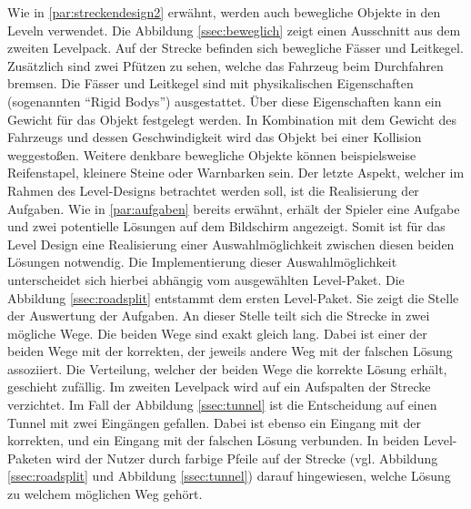 		Wie in \ref{par:streckendesign2} erwähnt, werden auch bewegliche Objekte in den Leveln verwendet. Die Abbildung \ref{ssec:beweglich} zeigt einen Ausschnitt aus dem zweiten Levelpack. Auf der Strecke befinden sich bewegliche Fässer und Leitkegel. Zusätzlich sind zwei Pfützen zu sehen, welche das Fahrzeug beim Durchfahren bremsen. Die Fässer und Leitkegel sind mit physikalischen Eigenschaften (sogenannten \enquote{Rigid Bodys}) ausgestattet. Über diese Eigenschaften kann ein Gewicht für das Objekt festgelegt werden. In Kombination mit dem Gewicht des Fahrzeugs und dessen Geschwindigkeit wird das Objekt bei einer Kollision weggestoßen. Weitere denkbare bewegliche Objekte können beispielsweise Reifenstapel, kleinere Steine oder Warnbarken sein.
		Der letzte Aspekt, welcher im Rahmen des Level-Designs betrachtet werden soll, ist die Realisierung der Aufgaben. Wie in \ref{par:aufgaben} bereits erwähnt, erhält der Spieler eine Aufgabe und zwei potentielle Lösungen auf dem Bildschirm angezeigt. Somit ist für das Level Design eine Realisierung einer Auswahlmöglichkeit zwischen diesen beiden Lösungen notwendig. Die Implementierung dieser Auswahlmöglichkeit unterscheidet sich hierbei abhängig vom ausgewählten Level-Paket.
		Die Abbildung \ref{ssec:roadsplit} entstammt dem ersten Level-Paket. Sie zeigt die Stelle der Auswertung der Aufgaben. An dieser Stelle teilt sich die Strecke in zwei mögliche Wege. Die beiden Wege sind exakt gleich lang. Dabei ist einer der beiden Wege mit der korrekten, der jeweils andere Weg mit der falschen Lösung assoziiert. Die Verteilung, welcher der beiden Wege die korrekte Lösung erhält, geschieht zufällig.
		Im zweiten Levelpack wird auf ein Aufspalten der Strecke verzichtet. Im Fall der Abbildung \ref{ssec:tunnel} ist die Entscheidung auf einen Tunnel mit zwei Eingängen gefallen. Dabei ist ebenso ein Eingang mit der korrekten, und ein Eingang mit der falschen Lösung verbunden. In beiden Level-Paketen wird der Nutzer durch farbige Pfeile auf der Strecke (vgl. Abbildung \ref{ssec:roadsplit} und Abbildung \ref{ssec:tunnel}) darauf hingewiesen, welche Lösung zu welchem möglichen Weg gehört.

